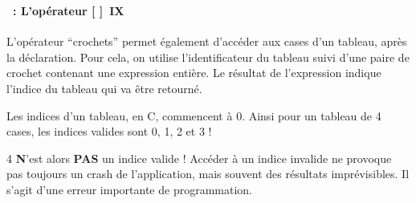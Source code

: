 \begin{frame}%
  \frametitle{\secname}
  \framesubtitle{\subsecname~: L'opérateur [ ]~IX}

  L'opérateur ``crochets'' permet également d'accéder aux cases d'un tableau, après la déclaration. Pour cela, on utilise l'identificateur
  du tableau suivi d'une paire de crochet contenant une expression entière. Le résultat de l'expression indique l'indice du tableau qui
  va être retourné.
  \vspace{0.5cm}
  \par
  Les indices d'un tableau, en C, commencent à 0. Ainsi pour un tableau de 4 cases, les indices valides sont 0, 1, 2 et 3 ! 
  \vspace{0.5cm}
  \par
  4 \textbf{N}'est alors \textbf{PAS} un indice valide ! Accéder à un indice invalide ne provoque pas toujours un crash de l'application,
  mais souvent des résultats imprévisibles. Il s'agit d'une erreur importante de programmation.
\end{frame}

